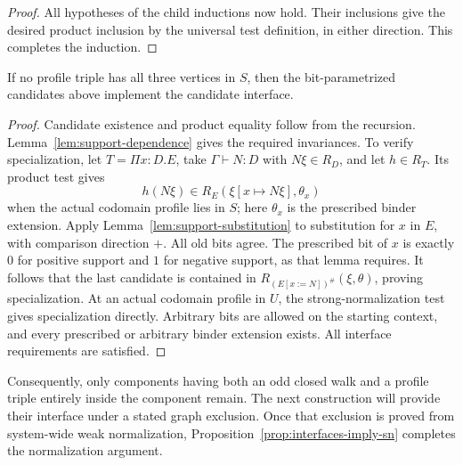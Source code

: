 \begin{proof}
All hypotheses of the child inductions now hold. Their inclusions
give the desired product inclusion by the universal test definition,
in either direction. This completes the induction.
\end{proof}

\begin{proposition}
\label{prop:one-child-component}
If no profile triple has all three vertices in $S$, then the
bit-parametrized candidates above implement the candidate interface.
\end{proposition}

\begin{proof}
Candidate existence and product equality follow from the recursion.
Lemma~\ref{lem:support-dependence} gives the required invariances.
To verify specialization, let
$T=\Pi x:D.E$, take $\Gamma\vdash N:D$ with $N\xi\in R_D$,
and let $h\in R_T$. Its product test gives
\[
 h(N\xi)\in R_E(\xi[x\mapsto N\xi],\theta_x)
\]
when the actual codomain profile lies in $S$; here $\theta_x$ is
the prescribed binder extension. Apply
Lemma~\ref{lem:support-substitution} to substitution for $x$ in
$E$, with comparison direction $+$. All old bits agree. The
prescribed bit of $x$ is exactly $0$ for positive support and $1$
for negative support, as that lemma requires. It follows that the
last candidate is contained in
$R_{(E[x:=N])^\#}(\xi,\theta)$, proving specialization. At an
actual codomain profile in $U$, the strong-normalization test gives
specialization directly. Arbitrary bits are allowed on the starting
context, and every prescribed or arbitrary binder extension exists.
All interface requirements are satisfied.
\end{proof}

Consequently, only components having both an odd closed walk and a
profile triple entirely inside the component remain. The next
construction will provide their interface under a stated graph
exclusion. Once that exclusion is proved from system-wide weak
normalization, Proposition~\ref{prop:interfaces-imply-sn} completes
the normalization argument.
